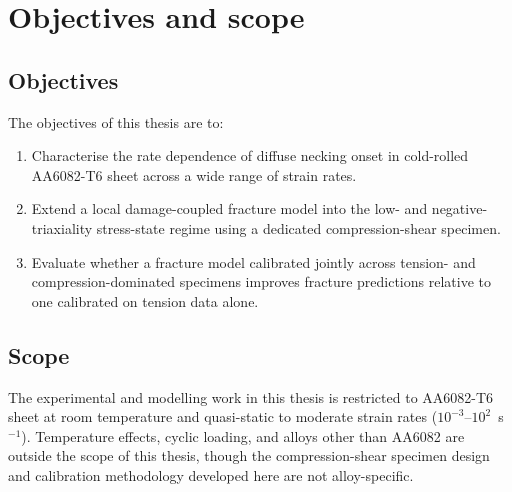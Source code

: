\chapter{Objectives and scope}
\label{Ch:ObjectivesScope}

\section{Objectives}
\label{Sec:Objectives}

The objectives of this thesis are to:

\begin{enumerate}
    \item Characterise the rate dependence of diffuse necking onset in
    cold-rolled AA6082-T6 sheet across a wide range of strain rates.
    \item Extend a local damage-coupled fracture model into the low- and
    negative-triaxiality stress-state regime using a dedicated
    compression-shear specimen.
    \item Evaluate whether a fracture model calibrated jointly across
    tension- and compression-dominated specimens improves fracture
    predictions relative to one calibrated on tension data alone.
\end{enumerate}

\section{Scope}
\label{Sec:Scope}

The experimental and modelling work in this thesis is restricted to
AA6082-T6 sheet at room temperature and quasi-static to moderate strain
rates ($10^{-3}$--$10^{2}$~s$^{-1}$). Temperature effects, cyclic loading,
and alloys other than AA6082 are outside the scope of this thesis, though
the compression-shear specimen design and calibration methodology developed
here are not alloy-specific.
